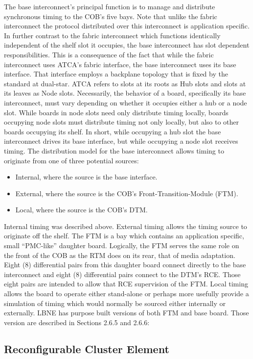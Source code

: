The base interconnect's principal function is to manage and distribute synchronous timing to the COB's five bays. Note that unlike the fabric interconnect the protocol distributed over this interconnect is application specific. In further contrast to the fabric interconnect which functions identically independent of the shelf slot it occupies, the base interconnect has slot dependent responsibilities. This is a consequence of the fact that while the fabric interconnect uses ATCA's fabric interface, the base interconnect uses its base interface. That interface employs a backplane topology that is fixed by the standard at dual-star. ATCA refers to slots at its roots as Hub slots and slots at its leaves as Node slots. Necessarily, the behavior of a board, specifically its base interconnect, must vary depending on whether it occupies either a hub or a node slot. While boards in node slots need only distribute timing locally, boards occupying node slots must distribute timing not only locally, but also to other boards occupying its shelf. In short, while occupying a hub slot the base interconnect drives its base interface, but while occupying a node slot receives timing.
The distribution model for the base interconnect allows timing to originate from one of three potential sources:
\begin{itemize}
\item Internal, where the source is the base interface.
\item External, where the source is the COB's Front-Transition-Module (FTM).
\item Local, where the source is the COB's DTM.
\end{itemize}
Internal timing was described above. External timing allows the timing source to originate off the shelf. The FTM is a bay which contains an application specific, small “PMC-like” daughter board. Logically, the FTM serves the same role on the front of the COB as the RTM does on its rear, that of media adaptation. Eight (8) differential pairs from this daughter board connect directly to the base interconnect and eight (8) differential pairs connect to the DTM's RCE. Those eight pairs are intended to allow that RCE supervision of the FTM. Local timing allows the board to operate either stand-alone or perhaps more usefully provide a simulation of timing which would normally be sourced either internally or externally.
LBNE has purpose built versions of both FTM and base board. Those version are described in Sections 2.6.5 and 2.6.6:


\subsection{Reconfigurable Cluster Element}

